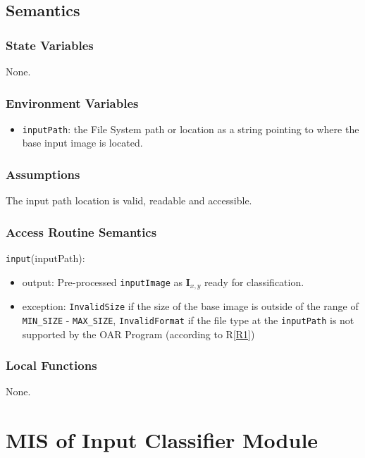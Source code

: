 \documentclass[12pt, titlepage]{article}
\def\code#1{\texttt{#1}}
\begin{document}
\subsection{Semantics}

\subsubsection{State Variables}

None.

\subsubsection{Environment Variables}

\begin{itemize}
  \item \code{inputPath}: the File System path or location as a string pointing to where the base input image is located.
\end{itemize}

\subsubsection{Assumptions}

The input path location is valid, readable and accessible.

\subsubsection{Access Routine Semantics}

\noindent \code{input}(inputPath):
\begin{itemize}
\item output: Pre-processed \code{inputImage} as $\mathbf{I}_{x,y}$ ready for classification.
\item exception: \code{InvalidSize} if the size of the base image is outside of the range of 
\code{MIN_SIZE} - \code{MAX_SIZE}, \code{InvalidFormat} if the file type at the \code{inputPath} is not 
supported by the OAR Program (according to R\ref{R1})
\end{itemize}

\subsubsection{Local Functions}

None.


\section{MIS of Input Classifier Module} \label{ModuleIC} 
\end{document}
